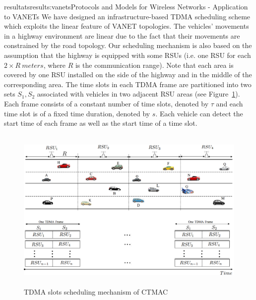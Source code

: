 \documentclass{ra2016}
\begin{document}
\begin{module}{resultats}{results:vanets}{Protocols and Models for Wireless Networks - Application to VANETs}
We have designed an infrastructure-based TDMA scheduling scheme which exploits the linear feature of VANET topologies. The 
vehicles' movements in a highway environment are linear due to the fact that their movements are constrained by the road topology. Our 
scheduling mechanism is also based on the assumption that the highway is equipped with some RSUs (i.e. one RSU 
for each $2\times R~meters$, where $R$ is the communication range). Note that each area is covered by one RSU installed on 
the side of the highway and in the middle of the corresponding area. The time slots in each TDMA 
frame are partitioned into two sets $S_1, S_2$ associated with vehicles in two adjacent RSU 
areas (see Figure~\ref{fig:CTSA}). Each frame consists of a constant number of time slots, denoted by $\tau$ and each time 
slot is of a fixed time duration, denoted by $s$. Each vehicle can detect the start time of each frame as well as the 
start time of a time slot. 

  \begin{figure}[!htbp]
  \begin{center}
 \includegraphics[height=8cm,width=14cm]{IMG/CTMACprinciple.png}
 \caption{TDMA slots scheduling mechanism of CTMAC}
 \label{fig:CTSA}
  \end{center}
\end{figure}


\end{module}
\end{document}
